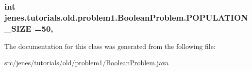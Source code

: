 \hypertarget{classjenes_1_1tutorials_1_1old_1_1problem1_1_1_boolean_problem_a2e3533716f1eb0515e413d6547f9b7b3}{
\subsubsection[{P\-O\-P\-U\-L\-A\-T\-I\-O\-N\-\_\-\-S\-I\-Z\-E}]{\setlength{\rightskip}{0pt plus 5cm}int jenes.\-tutorials.\-old.\-problem1.\-Boolean\-Problem.\-P\-O\-P\-U\-L\-A\-T\-I\-O\-N\-\_\-\-S\-I\-Z\-E =50\hspace{0.3cm}{\ttfamily [static]}, {\ttfamily [private]}}}\label{classjenes_1_1tutorials_1_1old_1_1problem1_1_1_boolean_problem_a2e3533716f1eb0515e413d6547f9b7b3}


The documentation for this class was generated from the following file\-:\begin{DoxyCompactItemize}
\item 
src/jenes/tutorials/old/problem1/\hyperlink{old_2problem1_2_boolean_problem_8java}{Boolean\-Problem.\-java}\end{DoxyCompactItemize}
